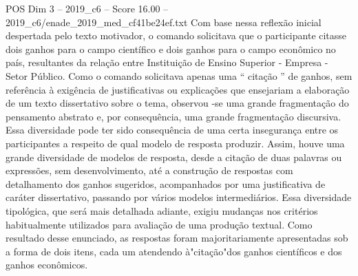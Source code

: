 \begin{textsample}{POS Dim 3 – 2019\_c6 – Score 16.00 – 2019\_c6/enade\_2019\_med\_cf41be24ef.txt}
Com base nessa reflexão inicial despertada pelo texto motivador, o comando solicitava que o participante citasse dois ganhos para o campo científico e dois ganhos para o campo econômico no país, resultantes da relação entre Instituição de Ensino Superior - Empresa - Setor Público.
Como o comando solicitava apenas uma “ citação ” de ganhos, sem referência à exigência de justificativas ou explicações que ensejariam a elaboração de um texto dissertativo sobre o tema, observou -se uma grande fragmentação do pensamento abstrato e, por consequência, uma grande fragmentação discursiva.
Essa diversidade pode ter sido consequência de uma certa insegurança entre os participantes a respeito de qual modelo de resposta produzir.
Assim, houve uma grande diversidade de modelos de resposta, desde a citação de duas palavras ou expressões, sem desenvolvimento, até a construção de respostas com detalhamento dos ganhos sugeridos, acompanhados por uma justificativa de caráter dissertativo, passando por vários modelos intermediários.
Essa diversidade tipológica, que será mais detalhada adiante, exigiu mudanças nos critérios habitualmente utilizados para avaliação de uma produção textual.
Como resultado desse enunciado, as respostas foram majoritariamente apresentadas sob a forma de dois itens, cada um atendendo à"citação"dos ganhos científicos e dos ganhos econômicos.

\end{textsample}
